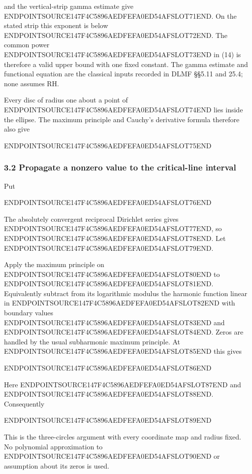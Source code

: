 and the vertical-strip gamma estimate give ENDPOINTSOURCE147F4C5896AEDFEFA0ED54AFSLOT71END. On the stated strip this exponent is below ENDPOINTSOURCE147F4C5896AEDFEFA0ED54AFSLOT72END. The common power ENDPOINTSOURCE147F4C5896AEDFEFA0ED54AFSLOT73END in (14) is therefore a valid upper bound with one fixed constant. The gamma estimate and functional equation are the classical inputs recorded in DLMF §§5.11 and 25.4; none assumes RH.

Every disc of radius one about a point of ENDPOINTSOURCE147F4C5896AEDFEFA0ED54AFSLOT74END lies inside the ellipse. The maximum principle and Cauchy's derivative formula therefore also give

ENDPOINTSOURCE147F4C5896AEDFEFA0ED54AFSLOT75END

\subsubsection{3.2 Propagate a nonzero value to the critical-line interval}\label{endpoint-arithmetic_original--propagate-a-nonzero-value-to-the-critical-line-interval}

Put

ENDPOINTSOURCE147F4C5896AEDFEFA0ED54AFSLOT76END

The absolutely convergent reciprocal Dirichlet series gives ENDPOINTSOURCE147F4C5896AEDFEFA0ED54AFSLOT77END, so ENDPOINTSOURCE147F4C5896AEDFEFA0ED54AFSLOT78END. Let ENDPOINTSOURCE147F4C5896AEDFEFA0ED54AFSLOT79END.

Apply the maximum principle on ENDPOINTSOURCE147F4C5896AEDFEFA0ED54AFSLOT80END to ENDPOINTSOURCE147F4C5896AEDFEFA0ED54AFSLOT81END. Equivalently subtract from its logarithmic modulus the harmonic function linear in ENDPOINTSOURCE147F4C5896AEDFEFA0ED54AFSLOT82END with boundary values ENDPOINTSOURCE147F4C5896AEDFEFA0ED54AFSLOT83END and ENDPOINTSOURCE147F4C5896AEDFEFA0ED54AFSLOT84END. Zeros are handled by the usual subharmonic maximum principle. At ENDPOINTSOURCE147F4C5896AEDFEFA0ED54AFSLOT85END this gives

ENDPOINTSOURCE147F4C5896AEDFEFA0ED54AFSLOT86END

Here ENDPOINTSOURCE147F4C5896AEDFEFA0ED54AFSLOT87END and ENDPOINTSOURCE147F4C5896AEDFEFA0ED54AFSLOT88END. Consequently

ENDPOINTSOURCE147F4C5896AEDFEFA0ED54AFSLOT89END

This is the three-circles argument with every coordinate map and radius fixed. No polynomial approximation to ENDPOINTSOURCE147F4C5896AEDFEFA0ED54AFSLOT90END or assumption about its zeros is used.


